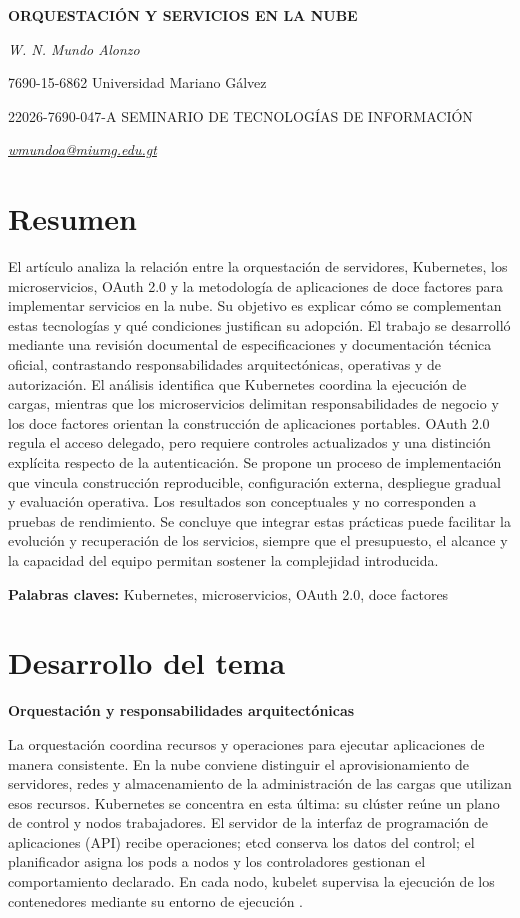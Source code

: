 \documentclass[12pt,letterpaper,onecolumn]{article}
\begin{document}
{\centering
\textbf{ORQUESTACIÓN Y SERVICIOS EN LA NUBE}\par
\textit{W. N. Mundo Alonzo}\par
7690-15-6862 Universidad Mariano Gálvez\par
22026-7690-047-A SEMINARIO DE TECNOLOGÍAS DE INFORMACIÓN\par
\textit{\href{mailto:wmundoa@miumg.edu.gt}{wmundoa@miumg.edu.gt}}\par
}

\section*{Resumen}
El artículo analiza la relación entre la orquestación de servidores, Kubernetes, los microservicios, OAuth 2.0 y la metodología de aplicaciones de doce factores para implementar servicios en la nube. Su objetivo es explicar cómo se complementan estas tecnologías y qué condiciones justifican su adopción. El trabajo se desarrolló mediante una revisión documental de especificaciones y documentación técnica oficial, contrastando responsabilidades arquitectónicas, operativas y de autorización. El análisis identifica que Kubernetes coordina la ejecución de cargas, mientras que los microservicios delimitan responsabilidades de negocio y los doce factores orientan la construcción de aplicaciones portables. OAuth 2.0 regula el acceso delegado, pero requiere controles actualizados y una distinción explícita respecto de la autenticación. Se propone un proceso de implementación que vincula construcción reproducible, configuración externa, despliegue gradual y evaluación operativa. Los resultados son conceptuales y no corresponden a pruebas de rendimiento. Se concluye que integrar estas prácticas puede facilitar la evolución y recuperación de los servicios, siempre que el presupuesto, el alcance y la capacidad del equipo permitan sostener la complejidad introducida.

\textbf{Palabras claves:} Kubernetes, microservicios, OAuth 2.0, doce factores

\section*{Desarrollo del tema}
\textbf{Orquestación y responsabilidades arquitectónicas}

La orquestación coordina recursos y operaciones para ejecutar aplicaciones de manera consistente. En la nube conviene distinguir el aprovisionamiento de servidores, redes y almacenamiento de la administración de las cargas que utilizan esos recursos. Kubernetes se concentra en esta última: su clúster reúne un plano de control y nodos trabajadores. El servidor de la interfaz de programación de aplicaciones (API) recibe operaciones; etcd conserva los datos del control; el planificador asigna los pods a nodos y los controladores gestionan el comportamiento declarado. En cada nodo, kubelet supervisa la ejecución de los contenedores mediante su entorno de ejecución \parencite{kubernetesComponentes}.
\end{document}
